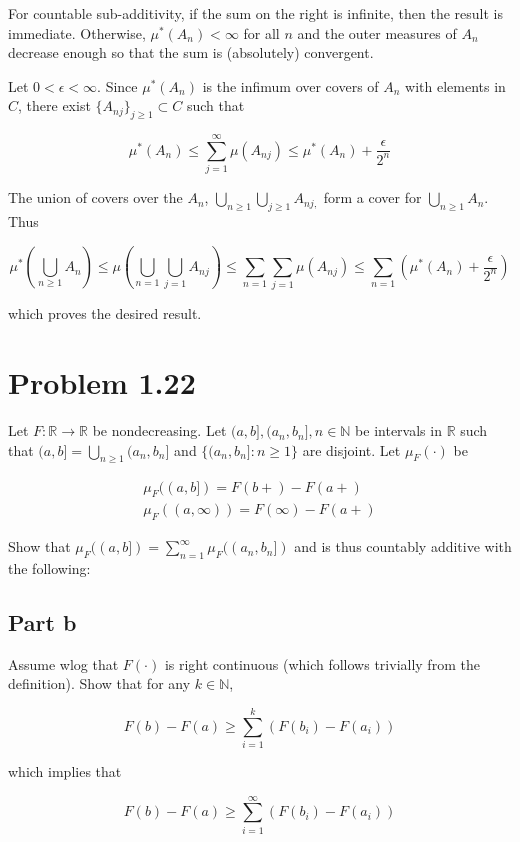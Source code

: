 \documentclass{article}
\newcommand{\R}{\mathbb{R}}
\newcommand{\N}{\mathbb{N}}
\begin{document}
For countable sub-additivity, if the sum on the right is infinite, then the result is immediate. Otherwise, $\mu^*(A_n) < \infty$ for all $n$ and the outer measures of $A_n$ decrease enough so that the sum is (absolutely) convergent.

Let $0 < \epsilon < \infty$. Since $\mu^*(A_n)$ is the infimum over covers of $A_n$ with elements in $C$, there exist $\{A_{nj}\}_{j \geq 1} \subset C$ such that

\[
\mu^*(A_n) \leq \sum_{j=1}^\infty \mu(A_{nj}) \leq \mu^*(A_n) + \frac{\epsilon}{2^n}
\]

The union of covers over the $A_n$, $\bigcup_{n \geq 1} \bigcup_{j \geq 1} A_{nj,}$ form a cover for $\bigcup_{n \geq 1} A_n$. Thus

\[
\mu^*\left( \bigcup_{n \geq 1} A_n \right) \leq
\mu\left( \bigcup_{n=1}\bigcup_{j=1} A_{nj} \right)
\leq \sum_{n=1}\sum_{j=1} \mu(A_{nj}) \leq \sum_{n=1}\left(\mu^*(A_n) + \frac{\epsilon}{2^n}\right)
\]

which proves the desired result.

\section*{Problem 1.22}

Let $F: \R \rightarrow \R$ be nondecreasing. Let $(a, b], (a_n, b_n], n \in \N$ be intervals in $\R$ such that $(a, b] = \bigcup_{n\geq 1} (a_n, b_n]$ and $\{(a_n, b_n]: n \geq 1 \}$ are disjoint. Let $\mu_F(\cdot)$ be

\begin{gather*}
\mu_F((a, b]) = F(b+) - F(a+) \\
\mu_F((a, \infty)) = F(\infty) - F(a+)
\end{gather*}

Show that $\mu_F((a, b]) = \sum_{n=1}^\infty \mu_F((a_n, b_n])$ and is thus countably additive with the following:

\subsection*{Part b}

Assume wlog that $F(\cdot)$ is right continuous (which follows trivially from the definition). Show that for any $k \in \N$,

\[
F(b) - F(a) \geq \sum_{i=1}^k(F(b_i) - F(a_i))
\]

which implies that 

\[
F(b) - F(a) \geq \sum_{i=1}^\infty(F(b_i) - F(a_i))
\]
\end{document}
